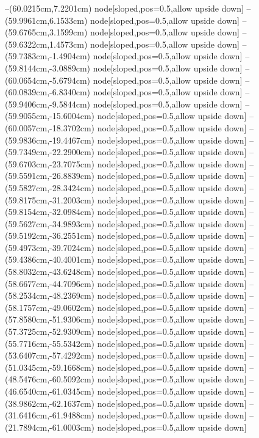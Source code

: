 --(60.0215cm,7.2201cm) node[sloped,pos=0.5,allow upside down]{\ArrowIn}
--(59.9961cm,6.1533cm) node[sloped,pos=0.5,allow upside down]{\ArrowIn}
--(59.6765cm,3.1599cm) node[sloped,pos=0.5,allow upside down]{\ArrowIn}
--(59.6322cm,1.4573cm) node[sloped,pos=0.5,allow upside down]{\ArrowIn}
--(59.7383cm,-1.4904cm) node[sloped,pos=0.5,allow upside down]{\ArrowIn}
--(59.8144cm,-3.0889cm) node[sloped,pos=0.5,allow upside down]{\ArrowIn}
--(60.0654cm,-5.6794cm) node[sloped,pos=0.5,allow upside down]{\ArrowIn}
--(60.0839cm,-6.8340cm) node[sloped,pos=0.5,allow upside down]{\ArrowIn}
--(59.9406cm,-9.5844cm) node[sloped,pos=0.5,allow upside down]{\ArrowIn}
--(59.9055cm,-15.6004cm) node[sloped,pos=0.5,allow upside down]{\ArrowIn}
--(60.0057cm,-18.3702cm) node[sloped,pos=0.5,allow upside down]{\ArrowIn}
--(59.9836cm,-19.4467cm) node[sloped,pos=0.5,allow upside down]{\ArrowIn}
--(59.7349cm,-22.2900cm) node[sloped,pos=0.5,allow upside down]{\ArrowIn}
--(59.6703cm,-23.7075cm) node[sloped,pos=0.5,allow upside down]{\ArrowIn}
--(59.5591cm,-26.8839cm) node[sloped,pos=0.5,allow upside down]{\ArrowIn}
--(59.5827cm,-28.3424cm) node[sloped,pos=0.5,allow upside down]{\ArrowIn}
--(59.8175cm,-31.2003cm) node[sloped,pos=0.5,allow upside down]{\ArrowIn}
--(59.8154cm,-32.0984cm) node[sloped,pos=0.5,allow upside down]{\arrowIn}
--(59.5627cm,-34.9893cm) node[sloped,pos=0.5,allow upside down]{\ArrowIn}
--(59.5192cm,-36.2551cm) node[sloped,pos=0.5,allow upside down]{\ArrowIn}
--(59.4973cm,-39.7024cm) node[sloped,pos=0.5,allow upside down]{\ArrowIn}
--(59.4386cm,-40.4001cm) node[sloped,pos=0.5,allow upside down]{\arrowIn}
--(58.8032cm,-43.6248cm) node[sloped,pos=0.5,allow upside down]{\ArrowIn}
--(58.6677cm,-44.7096cm) node[sloped,pos=0.5,allow upside down]{\ArrowIn}
--(58.2534cm,-48.2369cm) node[sloped,pos=0.5,allow upside down]{\ArrowIn}
--(58.1757cm,-49.0602cm) node[sloped,pos=0.5,allow upside down]{\arrowIn}
--(57.8580cm,-51.9306cm) node[sloped,pos=0.5,allow upside down]{\ArrowIn}
--(57.3725cm,-52.9309cm) node[sloped,pos=0.5,allow upside down]{\ArrowIn}
--(55.7716cm,-55.5342cm) node[sloped,pos=0.5,allow upside down]{\ArrowIn}
--(53.6407cm,-57.4292cm) node[sloped,pos=0.5,allow upside down]{\ArrowIn}
--(51.0345cm,-59.1668cm) node[sloped,pos=0.5,allow upside down]{\ArrowIn}
--(48.5476cm,-60.5092cm) node[sloped,pos=0.5,allow upside down]{\ArrowIn}
--(46.6540cm,-61.0345cm) node[sloped,pos=0.5,allow upside down]{\ArrowIn}
--(38.9862cm,-62.1637cm) node[sloped,pos=0.5,allow upside down]{\ArrowIn}
--(31.6416cm,-61.9488cm) node[sloped,pos=0.5,allow upside down]{\ArrowIn}
--(21.7894cm,-61.0003cm) node[sloped,pos=0.5,allow upside down]{\ArrowIn}
